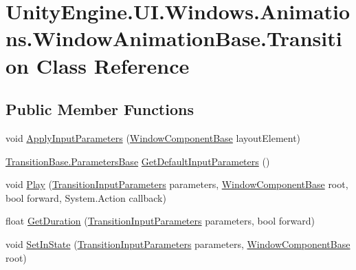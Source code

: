 \hypertarget{class_unity_engine_1_1_u_i_1_1_windows_1_1_animations_1_1_window_animation_base_1_1_transition}{}\section{Unity\+Engine.\+U\+I.\+Windows.\+Animations.\+Window\+Animation\+Base.\+Transition Class Reference}
\label{class_unity_engine_1_1_u_i_1_1_windows_1_1_animations_1_1_window_animation_base_1_1_transition}
\subsection*{Public Member Functions}
\begin{DoxyCompactItemize}
\item 
void \hyperlink{class_unity_engine_1_1_u_i_1_1_windows_1_1_animations_1_1_window_animation_base_1_1_transition_ab1c3a85d48dbaf3f6b8b124c7e94c62c}{Apply\+Input\+Parameters} (\hyperlink{class_unity_engine_1_1_u_i_1_1_windows_1_1_window_component_base}{Window\+Component\+Base} layout\+Element)
\item 
\hyperlink{class_unity_engine_1_1_u_i_1_1_windows_1_1_animations_1_1_transition_base_1_1_parameters_base}{Transition\+Base.\+Parameters\+Base} \hyperlink{class_unity_engine_1_1_u_i_1_1_windows_1_1_animations_1_1_window_animation_base_1_1_transition_af43daf22bd4dc88abdc60821237672aa}{Get\+Default\+Input\+Parameters} ()
\item 
void \hyperlink{class_unity_engine_1_1_u_i_1_1_windows_1_1_animations_1_1_window_animation_base_1_1_transition_a9bf641e78bc7f4a9fe495b9721a08f9b}{Play} (\hyperlink{class_unity_engine_1_1_u_i_1_1_windows_1_1_animations_1_1_transition_input_parameters}{Transition\+Input\+Parameters} parameters, \hyperlink{class_unity_engine_1_1_u_i_1_1_windows_1_1_window_component_base}{Window\+Component\+Base} root, bool forward, System.\+Action callback)
\item 
float \hyperlink{class_unity_engine_1_1_u_i_1_1_windows_1_1_animations_1_1_window_animation_base_1_1_transition_ab1bb6e4ef677774165c5462e7719d67d}{Get\+Duration} (\hyperlink{class_unity_engine_1_1_u_i_1_1_windows_1_1_animations_1_1_transition_input_parameters}{Transition\+Input\+Parameters} parameters, bool forward)
\item 
void \hyperlink{class_unity_engine_1_1_u_i_1_1_windows_1_1_animations_1_1_window_animation_base_1_1_transition_a8f8f1452f53b15b08063f2c100338e6a}{Set\+In\+State} (\hyperlink{class_unity_engine_1_1_u_i_1_1_windows_1_1_animations_1_1_transition_input_parameters}{Transition\+Input\+Parameters} parameters, \hyperlink{class_unity_engine_1_1_u_i_1_1_windows_1_1_window_component_base}{Window\+Component\+Base} root)

\end{DoxyCompactItemize}
